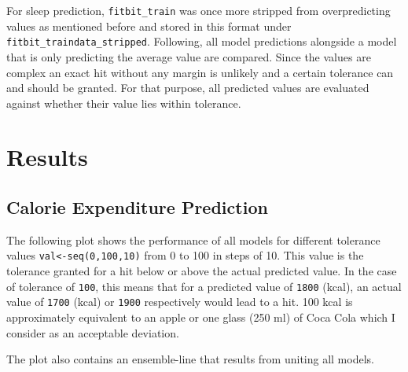 \documentclass[
]{article}
\newenvironment{Shaded}{\begin{snugshade}}{\end{snugshade}}
\newcommand{\CommentTok}[1]{\textcolor[rgb]{0.56,0.35,0.01}{\textit{#1}}}
\newcommand{\KeywordTok}[1]{\textcolor[rgb]{0.13,0.29,0.53}{\textbf{#1}}}
\newcommand{\NormalTok}[1]{#1}
\newcommand{\OperatorTok}[1]{\textcolor[rgb]{0.81,0.36,0.00}{\textbf{#1}}}
\newcommand{\StringTok}[1]{\textcolor[rgb]{0.31,0.60,0.02}{#1}}
\begin{document}
For sleep prediction, \texttt{fitbit\_train} was once more stripped from
overpredicting values as mentioned before and stored in this format
under \texttt{fitbit\_traindata\_stripped}. Following, all model
predictions alongside a model that is only predicting the average value
are compared. Since the values are complex an exact hit without any
margin is unlikely and a certain tolerance can and should be granted.
For that purpose, all predicted values are evaluated against whether
their value lies within tolerance.

\begin{Shaded}
\end{Shaded}

\newpage

\hypertarget{results}{%
\section{Results}\label{results}}

\hypertarget{calorie-expenditure-prediction-1}{%
\subsection{Calorie Expenditure
Prediction}\label{calorie-expenditure-prediction-1}}

The following plot shows the performance of all models for different
tolerance values \texttt{val\textless{}-seq(0,100,10)} from 0 to 100 in
steps of 10. This value is the tolerance granted for a hit below or
above the actual predicted value. In the case of tolerance of
\texttt{100}, this means that for a predicted value of \texttt{1800}
(kcal), an actual value of \texttt{1700} (kcal) or \texttt{1900}
respectively would lead to a hit. 100 kcal is approximately equivalent
to an apple or one glass (250 ml) of Coca Cola which I consider as an
acceptable deviation.

The plot also contains an ensemble-line that results from uniting all
models.
\end{document}
